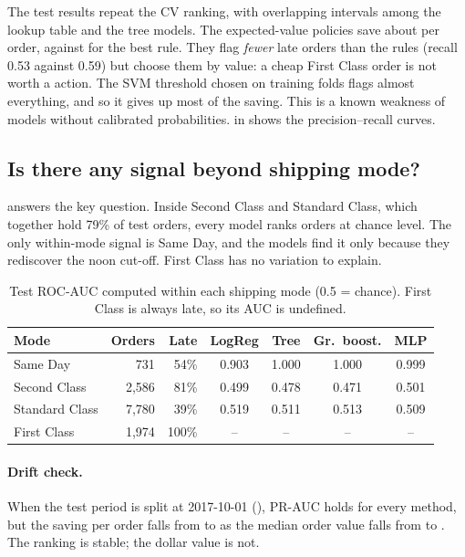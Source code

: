 The test results repeat the CV ranking, with overlapping intervals among the lookup table and
the tree models. The expected-value policies save about  per order, against 
for the best rule. They flag \emph{fewer} late orders than the rules (recall 0.53 against 0.59)
but choose them by value: a cheap First Class order is not worth a  action. The SVM
threshold chosen on training folds flags almost everything, and so it gives up most of the
saving. This is a known weakness of models without calibrated probabilities.  in  shows the precision--recall curves.


\subsection{Is there any signal beyond shipping mode?}
 answers the key question. Inside Second Class and Standard Class, which
together hold 79\% of test orders, every model ranks orders at chance level. The only
within-mode signal is Same Day, and the models find it only because they rediscover the noon
cut-off. First Class has no variation to explain.

\begin{table}[!htbp]
  \centering
  \caption{Test ROC-AUC computed within each shipping mode (0.5 = chance). First Class is always late, so its AUC is undefined.}
  \label{tab:within}
  \small
  \begin{tabular}{l r r c c c c}
    \toprule
    \textbf{Mode} & \textbf{Orders} & \textbf{Late} & \textbf{LogReg} & \textbf{Tree} & \textbf{Gr.\ boost.} & \textbf{MLP} \\
    \midrule
    Same Day       &   731 & 54\%  & 0.903 & 1.000 & 1.000 & 0.999 \\
    Second Class   & 2{,}586 & 81\% & 0.499 & 0.478 & 0.471 & 0.501 \\
    Standard Class & 7{,}780 & 39\% & 0.519 & 0.511 & 0.513 & 0.509 \\
    First Class    & 1{,}974 & 100\% & -- & -- & -- & -- \\
    \bottomrule
  \end{tabular}
\end{table}

\paragraph{Drift check.} When the test period is split at 2017-10-01 (), PR-AUC
holds for every method, but the saving per order falls from  to  as the median
order value falls from  to . The ranking is stable; the dollar value is not.
